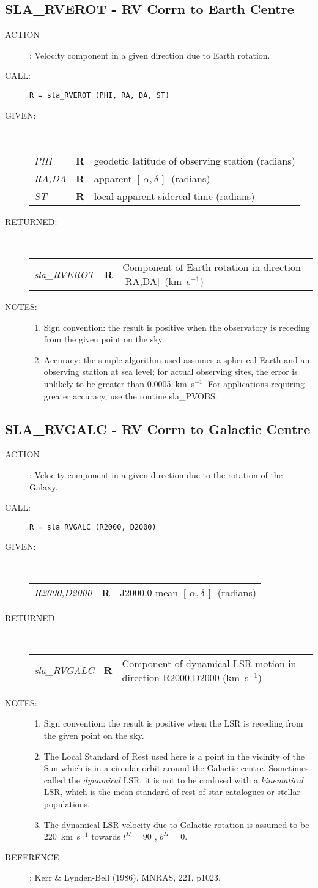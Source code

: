 \documentclass[11pt,twoside]{article}
\newcommand{\xlabel}[1]{}
\newcommand{\radec}     {$[\,\alpha,\delta\,]$}
\newcommand{\routine}[3]
{\hbadness=10000
  \vbox
  {
    \rule{\textwidth}{0.3mm}\\
    {\Large {\bf #1} \hfill #2 \hfill {\bf #1}}\\
    \setlength{\oldspacing}{\topsep}
    \setlength{\topsep}{0.3ex}
    \begin{description}
      #3
    \end{description}
    \setlength{\topsep}{\oldspacing}
  }
}
\renewcommand{\routine}[3]
   {
      \subsection{#1\xlabel{#1} - #2\label{#1}}
       \begin{description}
         #3
       \end{description}
   }
\newcommand{\action}[1]
{\item[ACTION]: #1}
\newcommand{\action}[1]
   {\item[ACTION:] #1}
\newcommand{\call}[1]
{\item[CALL]: \hspace{0.4em}{\tt #1}}
\newlength{\oldspacing}
\renewcommand{\call}[1]
   {
    \item[CALL:] {\tt #1}
   }
\newcommand{\args}[2]
{
  \goodbreak
  \setlength{\oldspacing}{\topsep}
  \setlength{\topsep}{0.3ex}
  \begin{description}
  \item[#1]:\\[1.5ex]
    \begin{tabular}{p{7em}p{6em}p{22em}}
      #2
    \end{tabular}
  \end{description}
  \setlength{\topsep}{\oldspacing}
}
\renewcommand{\args}[2]
   {
     \begin{description}
        \item[#1:]\\
        \begin{tabular}{p{7em}p{6em}l}
           #2
        \end{tabular}
     \end{description}
   }
\newcommand{\spec}[3]
{
  {\em {#1}} & {\bf \mbox{#2}} & {#3}
}
\newcommand{\notes}[1]
{
  \goodbreak
  \setlength{\oldspacing}{\topsep}
  \setlength{\topsep}{0.3ex}
  \begin{description}
    \item[NOTES]:
        #1
  \end{description}
  \setlength{\topsep}{\oldspacing}
}
\renewcommand{\notes}[1]
   {
      \begin{description}
         \item[NOTES:]
            #1
      \end{description}
   }
\newcommand{\aref}[1]
{
  \goodbreak
  \setlength{\oldspacing}{\topsep}
  \setlength{\topsep}{0.3ex}
  \begin{description}
    \item[REFERENCE]:
        #1
  \end{description}
  \setlength{\topsep}{\oldspacing}
}
\newcommand{\aref}[1]
   {
     \begin{description}
       \item[REFERENCE:]
           #1
     \end{description}
   }
\begin{document}
\routine{SLA\_RVEROT}{RV Corrn to Earth Centre}
{
 \action{Velocity component in a given direction due to Earth rotation.}
 \call{R~=~sla\_RVEROT (PHI, RA, DA, ST)}
}
\args{GIVEN}
{
 \spec{PHI}{R}{geodetic latitude of observing station (radians)} \\
 \spec{RA,DA}{R}{apparent \radec\ (radians)} \\
 \spec{ST}{R}{local apparent sidereal time (radians)}
}
\args{RETURNED}
{
 \spec{sla\_RVEROT}{R}{Component of Earth rotation in
                       direction [RA,DA]~(km~s$^{-1}$)}
}
\notes
{
 \begin{enumerate}
  \item Sign convention: the result is positive when the observatory
        is receding from the given point on the sky.
  \item Accuracy: the simple algorithm used assumes a spherical Earth and
        an observing station at sea level;  for actual observing
        sites, the error is unlikely to be greater than 0.0005~km~s$^{-1}$.
        For applications requiring greater accuracy, use the routine
        sla\_PVOBS.
 \end{enumerate}
}
\routine{SLA\_RVGALC}{RV Corrn to Galactic Centre}
{
 \action{Velocity component in a given direction due to the rotation
         of the Galaxy.}
 \call{R~=~sla\_RVGALC (R2000, D2000)}
}
\args{GIVEN}
{
 \spec{R2000,D2000}{R}{J2000.0 mean \radec\ (radians)}
}
\args{RETURNED}
{
 \spec{sla\_RVGALC}{R}{Component of dynamical LSR motion in direction
                       R2000,D2000 (km~s$^{-1}$)}
}
\notes
{
 \begin{enumerate}
  \item Sign convention: the result is positive when the LSR
        is receding from the given point on the sky.
  \item The Local Standard of Rest used here is a point in the
        vicinity of the Sun which is in a circular orbit around
        the Galactic centre.  Sometimes called the {\it dynamical}\/ LSR,
        it is not to be confused with a {\it kinematical}\/ LSR, which
        is the mean standard of rest of star catalogues or stellar
        populations.
  \item The dynamical LSR velocity due to Galactic rotation is assumed to
        be 220~km~s$^{-1}$ towards $l^{I\!I}=90^{\circ}$,
                                   $b^{I\!I}=0$.
 \end{enumerate}
}
\aref{Kerr \& Lynden-Bell (1986), MNRAS, 221, p1023.}
\end{document}
